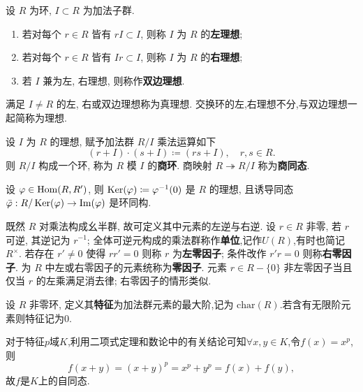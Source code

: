 \begin{definition}\label{def:ideals}
	设 $R$ 为环, $I \subset R$ 为加法子群.
	\begin{enumerate}
		\item 若对每个 $r \in R$ 皆有 $rI \subset I$, 则称 $I$ 为 $R$ 的\textbf{左理想};
		\item 若对每个 $r \in R$ 皆有 $Ir \subset I$, 则称 $I$ 为 $R$ 的\textbf{右理想};
		\item 若 $I$ 兼为左, 右理想, 则称作\textbf{双边理想}.
	\end{enumerate}
	满足 $I \neq R$ 的左, 右或双边理想称为真理想. 交换环的左,右理想不分,与双边理想一起简称为理想.
\end{definition}
\begin{definition}
	设 $I$ 为 $R$ 的理想, 赋予加法群 $R/I$ 乘法运算如下
	\[ (r+I) \cdot (s+I) \coloneqq (rs + I), \quad r, s \in R. \]
	则 $R/I$ 构成一个环, 称为 $R$ 模 $I$ 的\textbf{商环}. 商映射 $R \twoheadrightarrow R/I$ 称为\textbf{商同态}.
\end{definition}
\begin{theorem}[环同态基本定理]\label{thm:1st-homomorphism-ring}
	设 $\varphi\in\operatorname{\mathrm{Hom}}(R, R')$, 则 $\operatorname{\mathrm{Ker}}(\varphi) \coloneqq \varphi^{-1}(0)$ 是 $R$ 的理想, 且诱导同态 $\bar{\varphi}: R/\operatorname{\mathrm{Ker}}(\varphi) \to \operatorname{\mathrm{Im}}(\varphi)$ 是环同构.
\end{theorem}
\begin{definition}\label{def:unit}
	既然 $R$ 对乘法构成幺半群, 故可定义其中元素的左逆与右逆. 设 $r \in R$ 非零, 若 $r$ 可逆, 其逆记为 $r^{-1}$; 全体可逆元构成的乘法群称作\textbf{单位},记作$U(R)$,有时也简记 $R^\times$. 若存在 $r' \neq 0$ 使得 $rr'=0$ 则称 $r$ 为\textbf{左零因子}; 条件改作 $r'r=0$ 则称\textbf{右零因子}. 为 $R$ 中左或右零因子的元素统称为\textbf{零因子}. 元素 $r \in R-\{0\}$ 非左零因子当且仅当 $r$ 的左乘满足消去律; 右零因子的情形类似.
\end{definition}
\begin{definition}\label{def:ring-characteristic}
	设 $R$ 非零环, 定义其\textbf{特征}为加法群元素的最大阶,记为 $\text{char}(R)$.若含有无限阶元素则特征记为$0$.
\end{definition}
\begin{example}[Frobenius自同态]
	对于特征$p$域$K$,利用二项式定理和数论中的有关结论可知$\forall x,y\in K$,令$f(x)=x^p$,则
	\[
	f(x+y)=\left(x+y\right)^p=x^p+y^p=f(x)+f(y),
	\]
	故$f$是$K$上的自同态.
\end{example}
